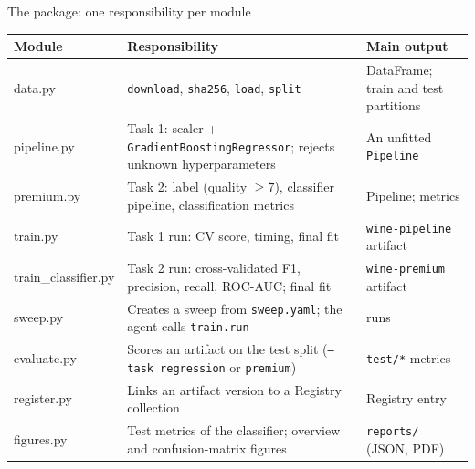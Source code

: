 \begin{frame}{The package: one responsibility per module}
\begingroup\scriptsize
\begin{tabularx}{\textwidth}{>{\ttfamily}l >{\raggedright\arraybackslash}X >{\raggedright\arraybackslash}X}
\normalfont\bfseries Module & \bfseries Responsibility & \bfseries Main output \\
\toprule
data.py & \texttt{download}, \texttt{sha256}, \texttt{load}, \texttt{split} & DataFrame; train and test partitions \\
\addlinespace[0.1em]
pipeline.py & Task 1: scaler + \texttt{GradientBoostingRegressor}; rejects unknown hyperparameters & An unfitted \texttt{Pipeline} \\
\addlinespace[0.1em]
premium.py & Task 2: label (quality $\ge 7$), classifier pipeline, classification metrics & Pipeline; metrics \\
\addlinespace[0.1em]
train.py & Task 1 run: CV score, timing, final fit & \texttt{wine-pipeline} artifact \\
\addlinespace[0.1em]
train\_classifier.py & Task 2 run: cross-validated F1, precision, recall, ROC-AUC; final fit & \texttt{wine-premium} artifact \\
\addlinespace[0.1em]
sweep.py & Creates a sweep from \texttt{sweep.yaml}; the agent calls \texttt{train.run} & 81 runs \\
\addlinespace[0.1em]
evaluate.py & Scores an artifact on the test split (\texttt{--task regression} or \texttt{premium}) & \texttt{test/*} metrics \\
\addlinespace[0.1em]
register.py & Links an artifact version to a Registry collection & Registry entry \\
\addlinespace[0.1em]
figures.py & Test metrics of the classifier; overview and confusion-matrix figures & \texttt{reports/} (JSON, PDF) \\
\bottomrule
\end{tabularx}
\par\endgroup
\coursefooter
\end{frame}


